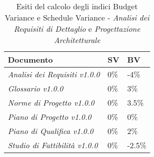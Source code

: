     \begin{table}[H]
    	\centering
    	\begin{tabular}{|C{7cm}|C{2cm}|C{2cm}|}
    		\hline
    		\textbf{Documento} & \textbf{SV} & \textbf{BV}  \\
    		\hline
    		\textit{Analisi dei Requisiti v1.0.0} & 0\% & -4\%  \\
    		\hline
    		\textit{Glossario v1.0.0} & 0\% &  3\% \\
    		\hline
    		\textit{Norme di Progetto v1.0.0} & 0\% & 3.5\% \\
    		\hline
    		\textit{Piano di Progetto v1.0.0} & 0\% & 0\% \\
    		\hline
    		\textit{Piano di Qualifica v1.0.0} & 0\% & 2\% \\
    		\hline
    		\textit{Studio di Fattibilità v1.0.0} & 0\% & -2.5\%\\
    		\hline
    		
    	\end{tabular}
    	\caption{Esiti del calcolo degli indici Budget Variance e Schedule Variance - \textit{Analisi dei Requisiti di Dettaglio} e \textit{Progettazione Architetturale}}
    \end{table}